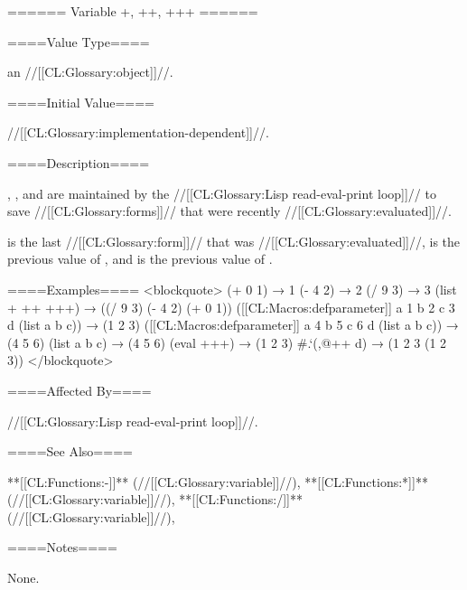 ====== Variable +, ++, +++ ======

====Value Type====

an //[[CL:Glossary:object]]//.

====Initial Value====

//[[CL:Glossary:implementation-dependent]]//.

====Description====

\Thevariables{+}, \misc{++}, and \misc{+++} are maintained by the //[[CL:Glossary:Lisp read-eval-print loop]]// to save //[[CL:Glossary:forms]]// that were recently //[[CL:Glossary:evaluated]]//.

\Thevalueof{+} is the last //[[CL:Glossary:form]]// that was //[[CL:Glossary:evaluated]]//, \thevalueof{++} is the previous value of \misc{+}, and \thevalueof{+++} is the previous value of \misc{++}.

====Examples==== <blockquote> (+ 0 1) → 1 (- 4 2) → 2 (/ 9 3) → 3 (list + ++ +++) → ((/ 9 3) (- 4 2) (+ 0 1)) ([[CL:Macros:defparameter]] a 1 b 2 c 3 d (list a b c)) → (1 2 3) ([[CL:Macros:defparameter]] a 4 b 5 c 6 d (list a b c)) → (4 5 6) (list a b c) → (4 5 6) (eval +++) → (1 2 3) #.`(,@++ d) → (1 2 3 (1 2 3)) </blockquote>

====Affected By====

//[[CL:Glossary:Lisp read-eval-print loop]]//.

====See Also====

**[[CL:Functions:-]]** (//[[CL:Glossary:variable]]//), **[[CL:Functions:*]]** (//[[CL:Glossary:variable]]//), **[[CL:Functions:/]]** (//[[CL:Glossary:variable]]//), {\secref\TopLevelLoop}

====Notes====

None.

